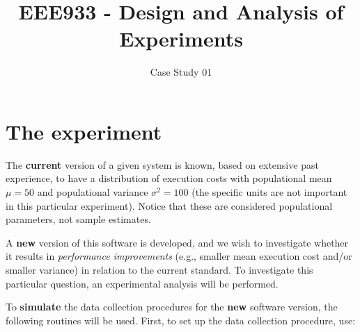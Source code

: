 \documentclass[11pt,twoside,printwatermark=false]{pinp}
\title{EEE933 - Design and Analysis of Experiments}
\author[]{Case Study 01}
\begin{document}
\verticaladjustment{-2pt}

\maketitle
\thispagestyle{firststyle}



\section{The experiment}\label{the-experiment}

The \textbf{current} version of a given system is known, based on
extensive past experience, to have a distribution of execution costs
with populational mean \(\mu = 50\) and populational variance
\(\sigma^2 = 100\) (the specific units are not important in this
particular experiment). Notice that these are considered populational
parameters, not sample estimates.

A \textbf{new} version of this software is developed, and we wish to
investigate whether it results in \emph{performance improvements} (e.g.,
smaller mean execution cost and/or smaller variance) in relation to the
current standard. To investigate this particular question, an
experimental analysis will be performed.

To \textbf{simulate} the data collection procedures for the \textbf{new}
software version, the following routines will be used. First, to set up
the data collection procedure, use:

\begin{Shaded}
\begin{Highlighting}[]
\NormalTok{(}\NormalTok{) }
\end{Highlighting}
\end{Shaded}
\end{document}

